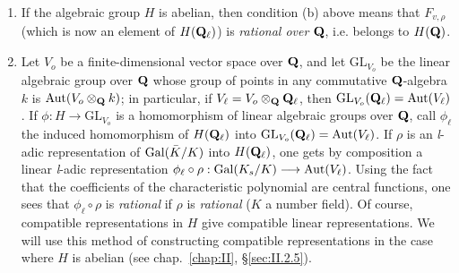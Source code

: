 \begin{remarks}
\begin{enumerate}[label=\arabic*.,leftmargin=2.2em,itemsep=0.15ex,topsep=0.4ex]
\item If the algebraic group $H$ is abelian, then condition (b) above
means that $F_{v,\rho}$ (which is now an element of $H(\mathbf{Q}_\ell)$) is
\emph{rational over} $\mathbf{Q}$, i.e. belongs to $H(\mathbf{Q})$.

\item Let $V_o$ be a finite-dimensional vector space over $\mathbf{Q}$, and
let $\mathrm{GL}_{V_o}$ be the linear algebraic group over $\mathbf{Q}$ whose
group of points in any commutative $\mathbf{Q}$-algebra $k$ is
$\mathrm{Aut}(V_o \mathbin{\otimes}_{\mathbf{Q}} k)$; in particular, if
$V_\ell = V_o \mathbin{\otimes}_{\mathbf{Q}} \mathbf{Q}_\ell$, then
$\mathrm{GL}_{V_o}(\mathbf{Q}_\ell) = \mathrm{Aut}(V_\ell)$.  If
$\phi : H \longrightarrow \mathrm{GL}_{V_o}$ is a homomorphism of
linear algebraic groups over $\mathbf{Q}$, call $\phi_\ell$ the induced
homomorphism of $H(\mathbf{Q}_\ell)$ into
$\mathrm{GL}_{V_o}(\mathbf{Q}_\ell) = \mathrm{Aut}(V_\ell)$.  If $\rho$ is an
\textit{l}-adic representation of $\mathrm{Gal}(\bar{K}/K)$ into $H(\mathbf{Q}_\ell)$,
one gets by composition a linear \textit{l}-adic representation
$\phi_\ell \circ \rho : \mathrm{Gal}(K_s/K) \longrightarrow \mathrm{Aut}(V_\ell)$.
Using the fact that the coefficients of the characteristic polynomial
are central functions, one sees that $\phi_\ell \circ \rho$ is
\emph{rational} if $\rho$ is \emph{rational} ($K$ a number field).  Of
course, compatible representations in $H$ give compatible linear
representations.  We will use this method of constructing compatible
representations in the case where $H$ is abelian (see
chap.~\ref{chap:II}, \S\ref{sec:II.2.5}).
\end{enumerate}
\end{remarks}



